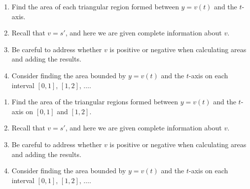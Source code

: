\begin{smallhint}
\begin{enumerate}
	\item Find the area of each triangular region formed between $y = v(t)$ and the $t$-axis.
	\item Recall that $v = s'$, and here we are given complete information about $v$.
	\item Be careful to address whether $v$ is positive or negative when calculating areas and adding the results.
	\item Consider finding the area bounded by $y = v(t)$ and the $t$-axis on each interval $[0,1]$, $[1,2]$, $\ldots$.
\end{enumerate}
\end{smallhint}
\begin{bighint}
\begin{enumerate}
	\item Find the area of the triangular regions formed between $y = v(t)$ and the $t$-axis on $[0,1]$ and $[1,2]$.
	\item Recall that $v = s'$, and here we are given complete information about $v$.
	\item Be careful to address whether $v$ is positive or negative when calculating areas and adding the results.
	\item Consider finding the area bounded by $y = v(t)$ and the $t$-axis on each interval $[0,1]$, $[1,2]$, $\ldots$.
\end{enumerate}
\end{bighint}
